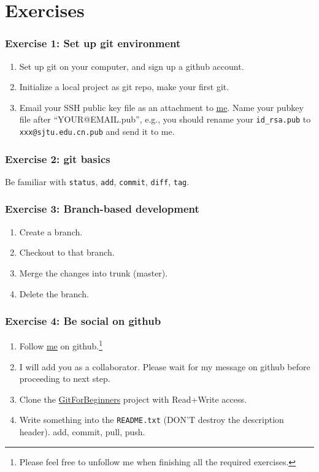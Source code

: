 \documentclass[11pt,ignorenonframetext,]{beamer}
\begin{document}
\section{Exercises}

\begin{frame}[fragile]\frametitle{Exercise 1: Set up git environment}

\begin{enumerate}[1.]
\item
  Set up git on your computer, and sign up a github account.
\item
  Initialize a local project as git repo, make your first git.
\item
  Email your SSH public key file as an attachment to
  \href{mailto:weijianwen@sjtu.edu.cn}{me}. Name your pubkey file after
  ``YOUR@EMAIL.pub'', e.g., you should rename your \texttt{id\_rsa.pub}
  to \texttt{xxx@sjtu.edu.cn.pub} and send it to me.
\end{enumerate}
\end{frame}

\begin{frame}[fragile]\frametitle{Exercise 2: git basics}

Be familiar with \texttt{status}, \texttt{add}, \texttt{commit},
\texttt{diff}, \texttt{tag}.

\end{frame}

\begin{frame}\frametitle{Exercise 3: Branch-based development}

\begin{enumerate}[1.]
\item
  Create a branch.
\item
  Checkout to that branch.
\item
  Merge the changes into trunk (master).
\item
  Delete the branch.
\end{enumerate}
\end{frame}

\begin{frame}[fragile]\frametitle{Exercise 4: Be social on github}

\begin{enumerate}[1.]
\item
  Follow \href{https://github.com/weijianwen}{me} on github.\footnote{Please
    feel free to unfollow me when finishing all the required exercises.}
\item
  I will add you as a collaborator. Please wait for my message on github
  before proceeding to next step.
\item
  Clone the
  \href{https://github.com/weijianwen/GitForBeginners}{GitForBeginners}
  project with Read+Write access.
\item
  Write something into the \texttt{README.txt} (DON'T destroy the
  description header). add, commit, pull, push.
\end{enumerate}
\end{frame}
\end{document}

